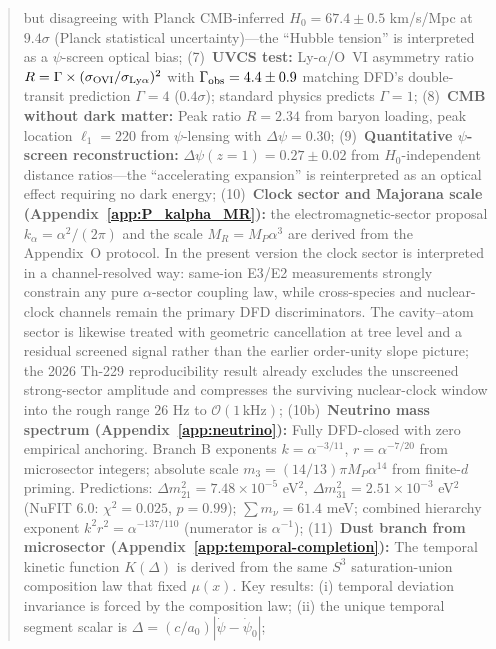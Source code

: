 \documentclass[aps,prd,twocolumn,superscriptaddress,showpacs,floatfix,nofootinbib]{revtex4-2}
\theoremstyle{plain}
\theoremstyle{definition}
\theoremstyle{remark}
\begin{document}
\begin{abstract}
but disagreeing with Planck CMB-inferred $H_0 = 67.4 \pm 0.5$ km/s/Mpc at $9.4\sigma$ (Planck statistical uncertainty)---the ``Hubble tension'' is interpreted as a $\psi$-screen optical bias;
%
(7)~\textbf{UVCS test:} Ly-$\alpha$/O~VI asymmetry ratio $R = \Gamma \times (\sigma_{\rm OVI}/\sigma_{\rm Ly\alpha})^2$ with 
$\Gamma_{\rm obs} = 4.4 \pm 0.9$ matching DFD's double-transit prediction $\Gamma = 4$ ($0.4\sigma$); standard physics predicts $\Gamma = 1$;
%
(8)~\textbf{CMB without dark matter:} Peak ratio $R = 2.34$ from baryon loading, 
peak location $\ell_1 = 220$ from $\psi$-lensing with $\Delta\psi = 0.30$;
%
(9)~\textbf{Quantitative $\psi$-screen reconstruction:} $\Delta\psi(z=1) = 0.27 \pm 0.02$ from $H_0$-independent 
distance ratios---the ``accelerating expansion'' is reinterpreted as an optical effect requiring no dark energy;
%
(10)~\textbf{Clock sector and Majorana scale (Appendix~\ref{app:P_kalpha_MR}):} the electromagnetic-sector proposal $k_\alpha = \alpha^2/(2\pi)$ and the scale $M_R = M_P\alpha^3$ are derived from the Appendix~O protocol. In the present version the clock sector is interpreted in a channel-resolved way: same-ion E3/E2 measurements strongly constrain any pure $\alpha$-sector coupling law, while cross-species and nuclear-clock channels remain the primary DFD discriminators. The cavity--atom sector is likewise treated with geometric cancellation at tree level and a residual screened signal rather than the earlier order-unity slope picture; the 2026 Th-229 reproducibility result already excludes the unscreened strong-sector amplitude and compresses the surviving nuclear-clock window into the rough range $26$ Hz to $\mathcal{O}(1\,\mathrm{kHz})$;
%
(10b)~\textbf{Neutrino mass spectrum (Appendix~\ref{app:neutrino}):} Fully DFD-closed with zero empirical anchoring. 
Branch B exponents $k = \alpha^{-3/11}$, $r = \alpha^{-7/20}$ from microsector integers; absolute scale 
$m_3 = (14/13)\pi M_P\alpha^{14}$ from finite-$d$ priming. Predictions: $\Delta m^2_{21} = 7.48 \times 10^{-5}$ eV$^2$, 
$\Delta m^2_{31} = 2.51 \times 10^{-3}$ eV$^2$ (NuFIT 6.0: $\chi^2 = 0.025$, $p = 0.99$); 
$\sum m_\nu = 61.4$ meV; combined hierarchy exponent $k^2r^2 = \alpha^{-137/110}$ (numerator is $\alpha^{-1}$);
%
(11)~\textbf{Dust branch from microsector (Appendix~\ref{app:temporal-completion}):} The temporal kinetic function $K(\Delta)$ is 
derived from the same $S^3$ saturation-union composition law that fixed $\mu(x)$. Key results: (i) temporal deviation 
invariance is forced by the composition law; (ii) the unique temporal segment scalar is $\Delta = (c/a_0)|\dot\psi - \dot\psi_0|$;

\end{abstract}
\end{document}
